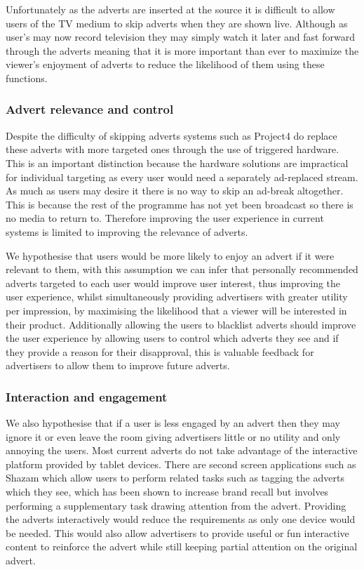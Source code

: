 Unfortunately as the adverts are inserted at the source it is difficult to allow users of the TV medium to skip adverts when they are shown live. Although as user's may now record television they may simply watch it later and fast forward through the adverts meaning that it is more important than ever to maximize the viewer's enjoyment of adverts to reduce the likelihood of them using these functions.

\subsubsection{Advert relevance and control}
Despite the difficulty of skipping adverts systems such as Project4 do replace these adverts with more targeted ones through the use of triggered hardware. This is an important distinction because the hardware solutions are impractical for individual targeting as every user would need a separately ad-replaced stream. As much as users may desire it there is no way to skip an ad-break altogether. This is because the rest of the programme has not yet been broadcast so there is no media to return to. Therefore improving the user experience in current systems is limited to improving the relevance of adverts.

We hypothesise that users would be more likely to enjoy an advert if it were relevant to them, with this assumption we can infer that personally recommended adverts targeted to each user would improve user interest, thus improving the user experience, whilst simultaneously providing advertisers with greater utility per impression, by maximising the likelihood that a viewer will be interested in their product. Additionally allowing the users to blacklist adverts should improve the user experience by allowing users to control which adverts they see and if they provide a reason for their disapproval, this is valuable feedback for advertisers to allow them to improve future adverts.

\subsubsection{Interaction and engagement}
We also hypothesise that if a user is less engaged by an advert then they may ignore it or even leave the room giving advertisers little or no utility and only annoying the users. Most current adverts do not take advantage of the interactive platform provided by tablet devices. There are second screen applications such as Shazam\cite{shazam} which allow users to perform related tasks such as tagging the adverts which they see, which has been shown to increase brand recall but involves performing a supplementary task drawing attention from the advert. Providing the adverts interactively would reduce the requirements as only one device would be needed. This would also allow advertisers to provide useful or fun interactive content to reinforce the advert while still keeping partial attention on the original advert.

